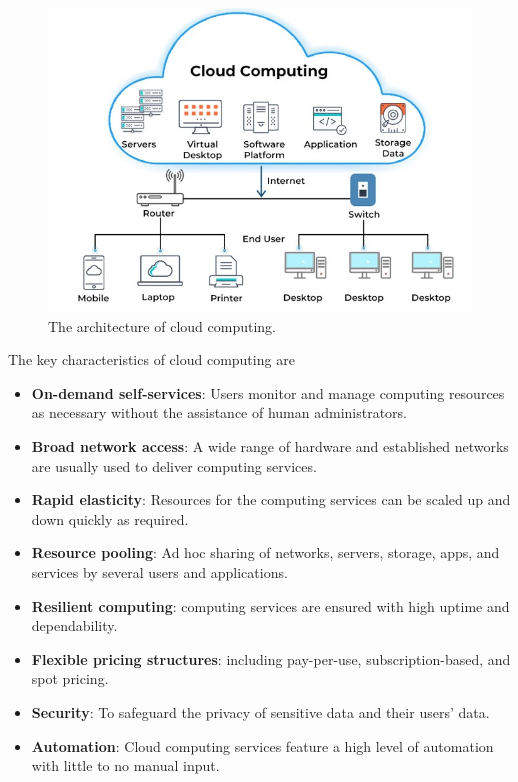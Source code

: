 \documentclass[
]{book}
\begin{document}
\begin{figure}

{\centering \includegraphics[width=0.9\linewidth]{img01/w01-CloudCompArchitecture} 

}

\caption{The architecture of cloud computing.}\label{fig:unnamed-chunk-6}
\end{figure}

The key characteristics of cloud computing are

\begin{itemize}
\item
  \textbf{On-demand self-services}: Users monitor and manage computing resources as necessary without the assistance of human administrators.
\item
  \textbf{Broad network access}: A wide range of hardware and established networks are usually used to deliver computing services.
\item
  \textbf{Rapid elasticity}: Resources for the computing services can be scaled up and down quickly as required.
\item
  \textbf{Resource pooling}: Ad hoc sharing of networks, servers, storage, apps, and services by several users and applications.
\item
  \textbf{Resilient computing}: computing services are ensured with high uptime and dependability.
\item
  \textbf{Flexible pricing structures}: including pay-per-use, subscription-based, and spot pricing.
\item
  \textbf{Security}: To safeguard the privacy of sensitive data and their users' data.
\item
  \textbf{Automation}: Cloud computing services feature a high level of automation with little to no manual input.
\end{itemize}
\end{document}

